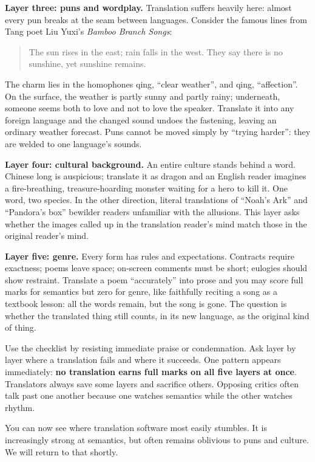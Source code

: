 \textbf{Layer three: puns and wordplay.} Translation suffers heavily here: almost every pun breaks at the seam between languages. Consider the famous lines from Tang poet Liu Yuxi's \emph{Bamboo Branch Songs}:

\begin{quote}
The sun rises in the east; rain falls in the west.\newline
They say there is no sunshine, yet sunshine remains.
\end{quote}
The charm lies in the homophones qing, ``clear weather'', and qing, ``affection''. On the surface, the weather is partly sunny and partly rainy; underneath, someone seems both to love and not to love the speaker. Translate it into any foreign language and the changed sound undoes the fastening, leaving an ordinary weather forecast. Puns cannot be moved simply by ``trying harder'': they are welded to one language's sounds.

\textbf{Layer four: cultural background.} An entire culture stands behind a word. Chinese long is auspicious; translate it as dragon and an English reader imagines a fire-breathing, treasure-hoarding monster waiting for a hero to kill it. One word, two species. In the other direction, literal translations of ``Noah's Ark'' and ``Pandora's box'' bewilder readers unfamiliar with the allusions. This layer asks whether the images called up in the translation reader's mind match those in the original reader's mind.

\textbf{Layer five: genre.} Every form has rules and expectations. Contracts require exactness; poems leave space; on-screen comments must be short; eulogies should show restraint. Translate a poem ``accurately'' into prose and you may score full marks for semantics but zero for genre, like faithfully reciting a song as a textbook lesson: all the words remain, but the song is gone. The question is whether the translated thing still counts, in its new language, as the original kind of thing.

Use the checklist by resisting immediate praise or condemnation. Ask layer by layer where a translation fails and where it succeeds. One pattern appears immediately: \textbf{no translation earns full marks on all five layers at once}. Translators always save some layers and sacrifice others. Opposing critics often talk past one another because one watches semantics while the other watches rhythm.

You can now see where translation software most easily stumbles. It is increasingly strong at semantics, but often remains oblivious to puns and culture. We will return to that shortly.

